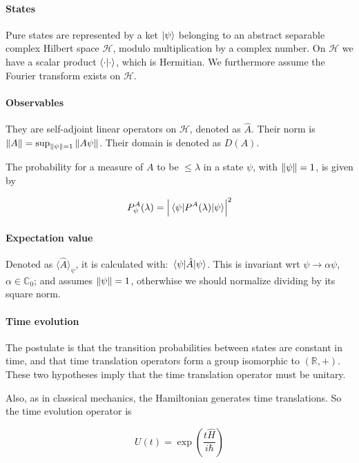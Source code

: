 \documentclass[main.tex]{subfiles}
\begin{document}
\paragraph{States} Pure states are represented by a ket $\ket{\psi}$ belonging to an abstract separable complex Hilbert  space $\mathcal{H}$, modulo multiplication by a complex number. On $\mathcal{H}$ we have a scalar product $\braket{\cdot}{\cdot}$, which is Hermitian. We furthermore assume the Fourier transform exists on $\mathcal{H}$.

\paragraph{Observables} They are self-adjoint linear operators on $\mathcal{H}$, denoted as $\hat{A}$. Their norm is $\norm{A} = \sup_{\norm{\psi}=1} \norm{A\psi}$. Their domain is denoted as $D(A)$.

The probability for a measure of $A$ to be $\leq \lambda$ in a state $\psi$, with $\norm{\psi}=1$, is given by

\begin{equation}
    P^A_\psi (\lambda) = \abs{\ev{P^A(\lambda)}{\psi}}^2
\end{equation}

\paragraph{Expectation value} Denoted as $\langle \hat{A} \rangle _\psi$, it is calculated with: $\ev{\hat{A}}{\psi}$. This is invariant wrt $\psi \rightarrow \alpha \psi$, $\alpha \in \mathbb{C}_0$; and assumes $\norm{\psi} =1$, otherwhise we should normalize dividing by its square norm.

\paragraph{Time evolution} The postulate is that the transition probabilities between states are constant in time, and that time translation operators form a group isomorphic to $(\mathbb{R}, +)$. These two hypotheses imply that the time translation operator must be unitary.

Also, as in classical mechanics, the Hamiltonian generates time translations. So the time evolution operator is

\begin{equation}\label{axiom:time-evolution}
    U(t) = \exp(\frac{t\hat{H}}{i\hbar})
\end{equation}
\end{document}
